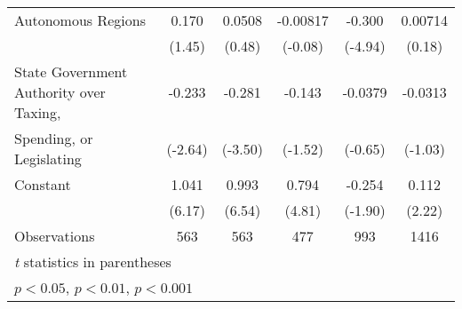 \begin{table}[htbp]
\begin{tabular}{l*{5}{c}}
Autonomous Regions                      &    0.170         &   0.0508         & -0.00817         &   -0.300\sym{***}&  0.00714         \\
                                        &   (1.45)         &   (0.48)         &  (-0.08)         &  (-4.94)         &   (0.18)         \\
\addlinespace
State Government Authority over Taxing, &   -0.233\sym{**} &   -0.281\sym{***}&   -0.143         &  -0.0379         &  -0.0313         \\
Spending, or Legislating                &  (-2.64)         &  (-3.50)         &  (-1.52)         &  (-0.65)         &  (-1.03)         \\
\addlinespace
Constant                                &    1.041\sym{***}&    0.993\sym{***}&    0.794\sym{***}&   -0.254         &    0.112\sym{*}  \\
                                        &   (6.17)         &   (6.54)         &   (4.81)         &  (-1.90)         &   (2.22)         \\
\midrule
Observations                            &      563         &      563         &      477         &      993         &     1416         \\
\bottomrule
\multicolumn{6}{l}{\footnotesize \textit{t} statistics in parentheses}\\
\multicolumn{6}{l}{\footnotesize \sym{*} \(p<0.05\), \sym{**} \(p<0.01\), \sym{***} \(p<0.001\)}\\
\end{tabular}
\end{table}
